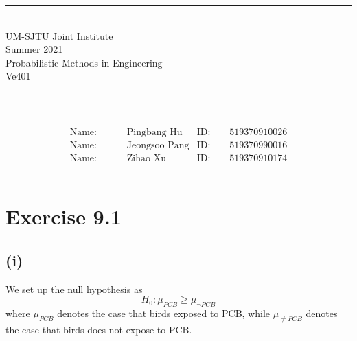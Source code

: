 \documentclass[13pt]{article}
\begin{document}
    \vspace{5cm}
    \begin{center}
        \rule{15cm}{0.01cm}
        \\\LARGE{
            UM-SJTU Joint Institute
            \\Summer 2021
            \\Probabilistic Methods in Engineering
            \\Ve401
          }
        \\\rule{15cm}{0.01cm}
        \\\vspace{6cm}
        \begin{Huge}
        \end{Huge}
    \end{center}
    \vfill
    \flushleft
    \begin{center}
        \begin{align*}
            \qquad\qquad\text{Name: }   \qquad& \text{Pingbang Hu}  &   \text{ID:} \qquad \text{519370910026}\qquad\qquad\\
            \qquad\qquad\text{Name: }   \qquad& \text{Jeongsoo Pang}&   \text{ID:} \qquad \text{519370990016}\qquad\qquad\\ 
            \qquad\qquad\text{Name: }   \qquad& \text{Zihao Xu}     &   \text{ID:} \qquad \text{519370910174}\qquad\qquad
        \end{align*}
        \mbox{}
        \\
    \end{center}

\setlength{\parindent}{1em}
\newpage
\thispagestyle{empty}
\setcounter{page}{1}

\newpage
\section*{Exercise 9.1}
\subsection*{(i)}
\par We set up the null hypothesis as 
\begin{equation*}
    H_0 : \mu_{PCB} \geq \mu_{\neg PCB}
\end{equation*}
where $\mu_{PCB}$ denotes the case that birds exposed to PCB, while $\mu_{\neq PCB}$ denotes the case that 
birds does not expose to PCB.
\end{document}
